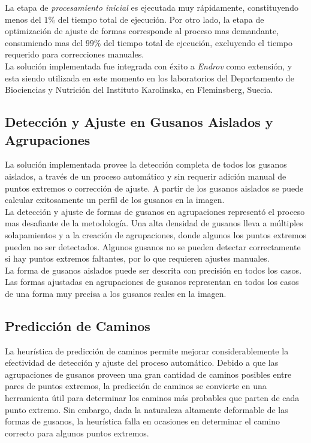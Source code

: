 La etapa de \emph{procesamiento inicial} es ejecutada muy r\'apidamente,
constituyendo menos del $1\%$ del tiempo total de ejecuci\'on. Por otro
lado, la etapa de optimizaci\'on de ajuste de formas corresponde al
proceso mas demandante, consumiendo mas del $99\%$ del tiempo total de
ejecuci\'on, excluyendo el tiempo requerido para correcciones manuales.\\

La soluci\'on implementada fue integrada con \'exito a \emph{Endrov} como
extensi\'on, y esta siendo utilizada en este momento en los laboratorios
del Departamento de Biociencias y Nutrici\'on del Instituto Karolinska, en
Fleminsberg, Suecia.



\subsection*{Detecci\'on y Ajuste en Gusanos Aislados y Agrupaciones}

La soluci\'on implementada provee la detecci\'on completa de todos
los gusanos aislados, a trav\'es de un proceso autom\'atico y sin 
requerir adici\'on manual de puntos extremos o correcci\'on
de ajuste. A partir de los gusanos aislados se puede calcular 
exitosamente un perfil de los gusanos en la imagen.\\

La detecci\'on y ajuste de formas de gusanos en agrupaciones represent\'o
el proceso mas desafiante de la metodolog\'ia. Una alta densidad
de gusanos lleva a m\'ultiples solapamientos y a la creaci\'on
de agrupaciones, donde algunos los puntos extremos pueden no
ser detectados. Algunos gusanos no se pueden detectar correctamente
si hay puntos extremos faltantes, por lo que requieren ajustes manuales.\\

La forma de gusanos aislados puede ser descrita con precisi\'on en todos
los casos. Las formas ajustadas en agrupaciones de gusanos representan
en todos los casos de una forma muy precisa a los gusanos reales en la imagen.

\subsection*{Predicci\'on de Caminos}

La heur\'istica de predicci\'on de caminos permite mejorar considerablemente
la efectividad de detecci\'on y ajuste del proceso autom\'atico. Debido
a que las agrupaciones de gusanos proveen una gran cantidad de caminos
posibles entre pares de puntos extremos, la predicci\'on de caminos se 
convierte en una herramienta \'util para determinar los caminos m\'as
probables que parten de cada punto extremo. Sin embargo, dada la naturaleza
altamente deformable de las formas de gusanos, la heur\'istica falla
en ocasiones en determinar el camino correcto para algunos puntos
extremos.

